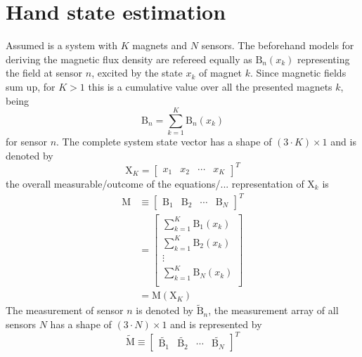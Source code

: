\section{Hand state estimation} \label{sec:estimation}

Assumed is a system with $ K $ magnets and $ N $ sensors. The beforehand models for deriving the magnetic flux density are refereed equally as $ \mathrm{B}_{n}(x_{k}) $ representing the field at sensor $ n $, excited by the state $ x_{k} $ of magnet $ k $. Since magnetic fields sum up, for $ K > 1 $ this is a cumulative value over all the presented magnets $ k $, being
\begin{equation}
\mathrm{B}_{n} = \sum_{k=1}^{K} \mathrm{B}_n(x_{k})
\end{equation}
for sensor $ n $. The complete system state vector has a shape of $ (3 \cdot K) \times 1 $ and is denoted by
\begin{equation}
\mathrm{X}_K = \begin{bmatrix} x_{1} & x_{2} & \cdots & x_{K}  \end{bmatrix}^{T}
\end{equation}
the overall measurable/outcome of the equations/...  representation of $ \mathrm{X}_{k} $ is
\begin{equation}
\begin{aligned}
\mathrm{M} &\equiv \begin{bmatrix} {\mathrm{B}}_{1} & {\mathrm{B}}_{2} & \cdots & {\mathrm{B}}_{N} \end{bmatrix}^{T}\\
		&= \begin{bmatrix}
			\sum_{k=1}^{K} \mathrm{B}_1(x_{k})\\
			\sum_{k=1}^{K} \mathrm{B}_2(x_{k})\\
			\vdots \\
		    \sum_{k=1}^{K} \mathrm{B}_N(x_{k})\\
		\end{bmatrix} \\
	    &= \mathrm{M}(\mathrm{X}_K)
\end{aligned}
\end{equation}
The measurement of sensor $ n $ is denoted by $ \tilde{\mathrm{B}}_{n} $, the measurement array of all sensors $ N $ has a shape of $ (3 \cdot N) \times 1 $ and is represented by
\begin{equation}
\tilde{\mathrm{M}} \equiv \begin{bmatrix} \tilde{\mathrm{B}_{1}} & \tilde{\mathrm{B}_{2}} & \cdots & \tilde{\mathrm{B}_{N}} \end{bmatrix}^{T}
\end{equation}
